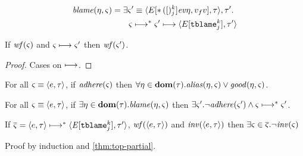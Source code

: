{\begin{align*}
 \blame(\mtimeline, \mstate) &= \exists \mstate'\equiv\chevron{E[\scev{k}{j}{\mtimeline}{\mval_f}{\mval}], \mTMons}, \mTMons'. \\
                             &\qquad\mstate \machstep^* \mstate' \machstep \chevron{E[\stblame{k}{j}], \mTMons'} \\
\end{align*}
%
\begin{lemma}\label{lem:wf}
  If $\wf(\mstate)$ and $\mstate \machstep \mstate'$ then $\wf(\mstate')$.
\end{lemma}
\begin{proof}
  Cases on $\machstep$.
\end{proof}
%
\begin{lemma}
  For all $\mstate\equiv\chevron{\mexp, \mTMons}$,
  if $\adhere(\mstate)$ then
  $\forall \mtimeline \in \dom(\mTMons). \alias(\mtimeline, \mstate) \vee \good(\mtimeline,\mstate)$.
\end{lemma}
%
\begin{lemma}
  For all $\mstate\equiv\chevron{\mexp, \mTMons}$,
  if $\exists \mtimeline \in \dom(\mTMons). \blame(\mtimeline,\mstate)$ then
  $\exists \mstate'. \neg\adhere(\mstate') \wedge \mstate \machstep^* \mstate'$.
\end{lemma}
%
\begin{theorem}
  If $\overline{\mstate} = \chevron{\mexp,\mTMons} \machstep^* \chevron{\mctx{\mmlab^\prime}[\stblame{k}{j}], \mTMons'}$, $\wf(\chevron{\mexp,\mTMons})$ and $\inv(\chevron{\mexp, \mTMons})$ then $\exists \mstate \in \overline{\mstate}.\neg\inv(\mstate)$
\end{theorem}
Proof by induction and \autoref{thm:top-partial}.
}
